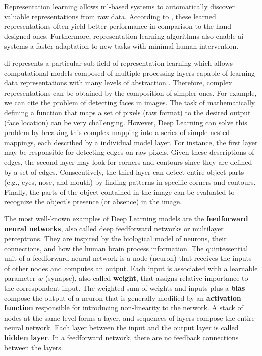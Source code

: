 Representation learning allows \acs{ml}-based systems to automatically discover valuable representations from raw data. According to \cite{goodfellow2016deep}, these learned representations often yield better performance in comparison to the hand-designed ones. Furthermore, representation learning algorithms also enable \acs{ai} systems a faster adaptation to new tasks with minimal human intervention.


\acf{dl} represents a particular sub-field of representation learning which allows computational models composed of multiple processing layers capable of learning data representations with many levels of abstraction \citep{lecun2015deep}. Therefore, complex representations can be obtained by the composition of simpler ones. For example, we can cite the problem of detecting faces in images. The task of mathematically defining a function that maps a set of pixels (raw format) to the desired output (face location) can be very challenging. However, Deep Learning can solve this problem by breaking this complex mapping into a series of simple nested mappings, each described by a individual model layer. For instance, the first layer may be responsible for detecting edges on raw pixels. Given these descriptions of edges, the second layer may look for corners and contours since they are defined by a set of edges. Consecutively, the third layer can detect entire object parts (e.g., eyes, nose, and mouth) by finding patterns in specific corners and contours. Finally, the parts of the object contained in the image can be evaluated to recognize the object's presence (or absence) in the image.

The most well-known examples of Deep Learning models are the \textbf{feedforward neural networks}, also called deep feedforward networks or multilayer perceptrons. They are inspired by the biological model of neurons, their connections, and how the human brain process information. The quintessential unit of a feedforward neural network is a node (neuron) that receives the inputs of other nodes and computes an output. Each input is associated with a learnable parameter $w$ (synapse), also called \textbf{weight}, that assigns relative importance to the correspondent input. The weighted sum of weights and inputs plus a \textbf{bias} compose the output of a neuron that is generally modified by an \textbf{activation function} responsible for introducing non-linearity to the network. A stack of nodes at the same level forms a layer, and sequences of layers compose the entire neural network. Each layer between the input and the output layer is called \textbf{hidden layer}. In a feedforward network, there are no feedback connections between the layers.

